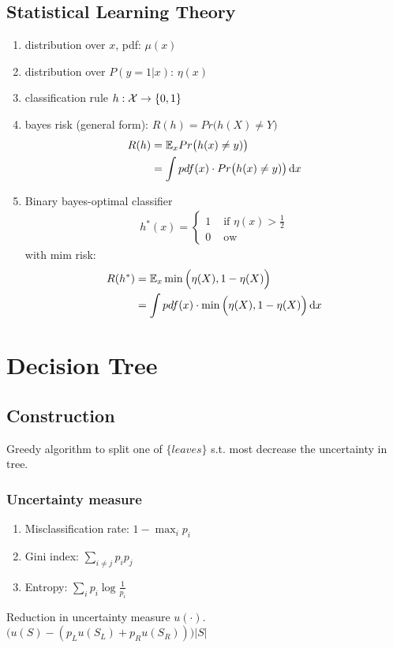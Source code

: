 \documentclass[a4paper]{report}
\begin{document}
\section{Statistical Learning Theory}
\begin{enumerate}
\item distribution over $x$, pdf: $\mu(x)$
\item distribution over $P(y=1|x)$: $\eta(x)$
\item classification rule $h: \mathcal{X}\rightarrow\{0, 1\}$
\item bayes risk (general form): $R(h)=Pr\big(h(X)\neq Y\big)$
\begin{align*}
R(h) &= \mathbb{E}_x Pr\big(h(x)\neq y)\big) \\
&= \int pdf(x)\cdot Pr\big(h(x)\neq y)\big) \mathop{}\!\mathrm{d} x
\end{align*}
\item Binary bayes-optimal classifier
\begin{eqnarray*}
h^*(x) = \left\{ \begin{array}{rl}
  1 &\mbox{ if }\eta(x)>\frac{1}{2}\\
  0 &\mbox{ ow}
       \end{array} \right.       
\end{eqnarray*}
with mim risk:
\begin{align*}
R(h^*) &= \mathbb{E}_x \min\Big(\eta(X), 1-\eta(X)\Big) \\
&= \int pdf(x)\cdot \min\Big(\eta(X), 1-\eta(X)\Big) \mathop{}\!\mathrm{d} x
\end{align*}


\end{enumerate}





\chapter{Decision Tree}
\section{Construction}
Greedy algorithm to split one of $\{leaves\}$ s.t. most decrease the uncertainty in tree. \subsection{Uncertainty measure}
\begin{enumerate}
\item Misclassification rate: $1-\max_i p_i$
\item Gini index: $\sum_{i\neq j} p_i p_j$
\item Entropy: $\sum_i p_i \log\frac{1}{p_i}$
\end{enumerate}
Reduction in uncertainty measure $u(\cdot)$.
$\Big(u(S)-(p_Lu(S_L)+p_Ru(S_R))\Big)|S|$
\end{document}

